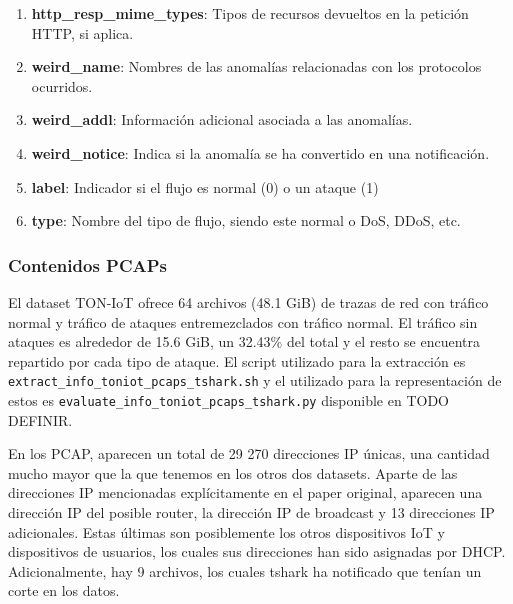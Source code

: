 \begin{enumerate}
  \item \textbf{http\_resp\_mime\_types}: Tipos de recursos devueltos en la petición HTTP, si aplica.
  \item \textbf{weird\_name}: Nombres de las anomalías relacionadas con los protocolos ocurridos.
  \item \textbf{weird\_addl}: Información adicional asociada a las anomalías.
  \item \textbf{weird\_notice}: Indica si la anomalía se ha convertido en una notificación.
  \item \textbf{label}: Indicador si el flujo es normal (0) o un ataque (1)
  \item \textbf{type}: Nombre del tipo de flujo, siendo este normal o DoS, DDoS, etc.
\end{enumerate}

\subsubsection{Contenidos PCAPs}

El dataset TON-IoT ofrece 64 archivos (48.1 GiB) de trazas de red con tráfico normal y tráfico de  ataques entremezclados con tráfico normal. El tráfico sin ataques es alrededor de 15.6 GiB, un 32.43\% del total y el resto se encuentra repartido por cada tipo de ataque. El script utilizado para la extracción es \texttt{extract\_info\_toniot\_pcaps\_tshark.sh} y el utilizado para la representación de estos es \texttt{evaluate\_info\_toniot\_pcaps\_tshark.py} disponible en TODO DEFINIR.

En los PCAP, aparecen un total de 29 270 direcciones IP únicas, una cantidad mucho mayor que la que tenemos en los otros dos datasets. Aparte de las direcciones IP mencionadas explícitamente en el paper original, aparecen una dirección IP del posible router, la dirección IP de broadcast y 13 direcciones IP adicionales. Estas últimas son posiblemente los otros dispositivos IoT y dispositivos de usuarios, los cuales sus direcciones han sido asignadas por DHCP. Adicionalmente, hay 9 archivos, los cuales tshark ha notificado que tenían un corte en los datos.


